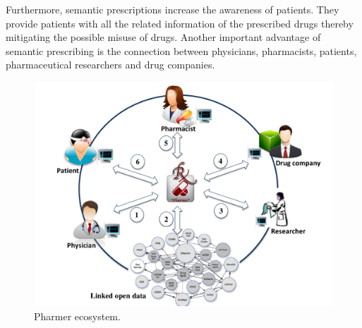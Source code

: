 \documentclass[10pt, conference, compsocconf]{IEEEtran}
\begin{document}
Furthermore, semantic prescriptions increase the awareness of patients.
They provide patients with all the related information of the prescribed drugs thereby mitigating the possible misuse of drugs.
Another important advantage of semantic prescribing is the connection between physicians, pharmacists, patients, pharmaceutical researchers and drug companies.

\begin{figure}[tb]
	\centering
		\includegraphics[width=1.0\columnwidth]{images/system.pdf}
	\caption{Pharmer ecosystem.}
	\label{fig:system}
\end{figure}
\end{document}
